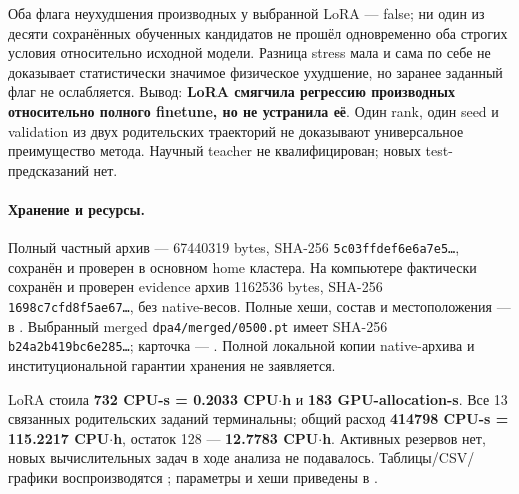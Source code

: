 \documentclass[11pt,a4paper]{article}
\begin{document}
Оба флага неухудшения производных у выбранной LoRA --- false;
ни один из десяти сохранённых обученных кандидатов не прошёл
одновременно оба строгих условия относительно исходной модели.
Разница stress мала и сама по себе не доказывает статистически
значимое физическое ухудшение, но заранее заданный флаг не ослабляется.
Вывод: \textbf{LoRA смягчила регрессию производных относительно полного
finetune, но не устранила её}. Один rank, один seed и validation из двух
родительских траекторий не доказывают универсальное преимущество метода.
Научный teacher не квалифицирован; новых test-предсказаний нет.

\paragraph{Хранение и ресурсы.}
Полный частный архив --- 67440319 bytes,
SHA-256 \texttt{5c03ffdef6e6a7e5\ldots}, сохранён и проверен в основном
home кластера. На компьютере фактически сохранён и проверен evidence
архив 1162536 bytes, SHA-256 \texttt{1698c7cfd8f5ae67\ldots},
без native-весов. Полные хеши, состав и местоположения --- в
.
Выбранный merged \texttt{dpa4/merged/0500.pt} имеет SHA-256
\texttt{b24a2b419bc6e285\ldots}; карточка ---
.
Полной локальной копии native-архива и институциональной гарантии
хранения не заявляется.

LoRA стоила \textbf{732 CPU-s = 0.2033 CPU$\cdot$h}
и \textbf{183 GPU-allocation-s}. Все 13 связанных родительских
заданий терминальны; общий расход \textbf{414798 CPU-s =
115.2217 CPU$\cdot$h}, остаток 128 --- \textbf{12.7783 CPU$\cdot$h}.
Активных резервов нет, новых вычислительных задач в ходе анализа
не подавалось. Таблицы/CSV/графики воспроизводятся
; параметры и хеши приведены в
.
\end{document}
